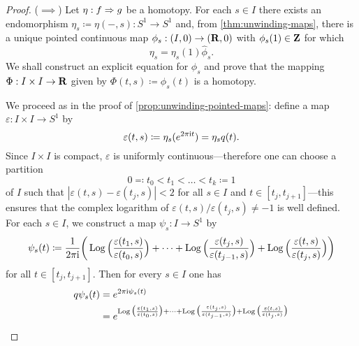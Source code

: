 \begin{proof}
    (\(\implies\)) Let \(\eta: f \Rightarrow g\) be a homotopy. For each \(s \in I\) there
    exists an endomorphism \(\eta_s \coloneq \eta(-, s): S^1 \to S^1\) and, from
    \cref{thm:unwinding-maps}, there is a unique pointed continuous map
    \(\phi_s: (I, 0) \to (\mathbf{R}, 0)\) with \(\phi_s(1) \in \mathbf{Z}\) for which
    \begin{equation}\label{eq:etas-from-widehat-phis}
        \eta_s = \eta_s(1) \widehat \phi_s.
    \end{equation}
    We shall construct an explicit equation for \(\phi_s\) and prove that the
    mapping \(\Phi: I \times I \to \mathbf{R}\) given by \(\Phi(t, s) \coloneq \phi_s(t)\)
    is a homotopy.

    We proceed as in the proof of \cref{prop:unwinding-pointed-maps}: define a map
    \(\varepsilon: I \times I \to S^1\) by
    \[
        \varepsilon(t, s) \coloneq \eta_s(e^{2 \pi \text{i} t}) = \eta_s q(t).
    \]
    Since \(I \times I\) is compact, \(\varepsilon\) is uniformly
    continuous---therefore one can choose a partition
    \[
        0 \eqqcolon t_0 < t_1 < \dots < t_k \coloneq 1
    \]
    of \(I\) such that \(|\varepsilon(t, s) - \varepsilon(t_j, s)| < 2\) for all
    \(s \in I\) and \(t \in [t_j, t_{j+1}]\)---this ensures that the complex
    logarithm of \(\varepsilon(t, s)/\varepsilon(t_j, s) \neq -1\) is well
    defined. For each \(s \in I\), we construct a map \(\psi_s: I \to S^1\) by
    \begin{equation}\label{eq:explicit-form-psis-actually-phis}
        \psi_s(t) \coloneq \frac{1}{2 \pi \text{i}} \bigg(
        \operatorname{Log} \Big( \frac{\varepsilon(t_1, s)}{\varepsilon(t_0, s)} \Big)
        + \dots +
        \operatorname{Log} \Big( \frac{\varepsilon(t_j, s)}{\varepsilon(t_{j-1}, s)} \Big)
        + \operatorname{Log} \Big( \frac{\varepsilon(t, s)}{\varepsilon(t_j, s)} \Big)
        \bigg)
    \end{equation}
    for all \(t \in [t_j, t_{j+1}]\). Then for every \(s \in I\) one has
    \begin{align*}
        q \psi_s(t) & = e^{2 \pi \img \psi_s(t)}                                             \\
                    & = e^{
                \Log \big( \frac{\varepsilon(t_1, s)}{\varepsilon(t_0, s)} \big)
                + \dots +
                \Log \big( \frac{\varepsilon(t_j, s)}{\varepsilon(t_{j-1}, s)} \big)
                + \Log \big( \frac{\varepsilon(t, s)}{\varepsilon(t_j, s)} \big)
        }                                                                                    \\

\end{align*}
\end{proof}
